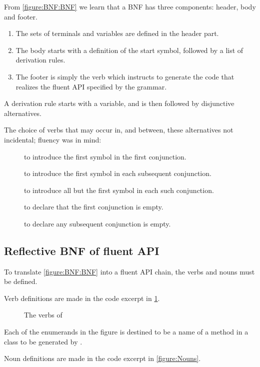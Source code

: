 From \cref{figure:BNF:BNF} we learn
that a BNF has three components: header, body and footer.
\begin{enumerate}
  \item The sets of terminals and variables are defined in the header part.
  \item The body starts with a definition of the start symbol, followed by a list of derivation
        rules.
  \item The footer is simply the verb  which instructs \Fajita
        to generate the code that realizes the fluent API specified by the grammar.
\end{enumerate}

A derivation rule starts with a variable, and is then followed by disjunctive alternatives.

The choice of verbs that may occur in, and between, these alternatives not incidental;
fluency was in mind:
\begin{description}
  \item[] to introduce the first symbol in the first conjunction.
  \item[] to introduce the first symbol in each subsequent conjunction.
  \item[] to introduce all but the first symbol in each such conjunction.
  \item[] to declare that the first conjunction is empty.
  \item[] to declare any subsequent conjunction is empty.
\end{description}

\subsection{Reflective BNF of fluent API}

To translate \cref{figure:BNF:BNF} into a fluent
API chain, the verbs and nouns must be defined.

Verb definitions are made in the code excerpt in
\cref{figure:Verbs}.

\begin{figure}[htb]
  \caption{The verbs of \Fajita}
  \label{figure:Verbs}
\end{figure}
Each of the enumerands in the figure is destined to be a
  name of a method in a class to be generated by \Fajita.

Noun definitions are made in the code excerpt in \cref{figure:Nouns}.

